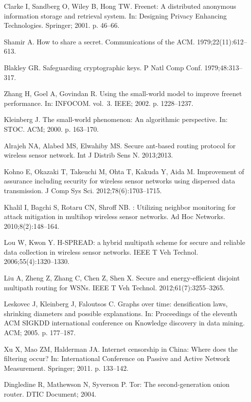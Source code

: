 \documentclass[10pt,letterpaper]{article}
\begin{document}
\begin{thebibliography}{10}
Clarke I, Sandberg O, Wiley B, Hong TW.
\newblock Freenet: {A} distributed anonymous information storage and retrieval
  system.
\newblock In: Designing {Privacy} {Enhancing} {Technologies}. Springer; 2001.
  p. 46--66.

Shamir A.
\newblock How to share a secret.
\newblock Communications of the ACM. 1979;22(11):612--613.

Blakley GR.
\newblock Safeguarding cryptographic keys.
\newblock P Natl Comp Conf. 1979;48:313--317.

Zhang H, Goel A, Govindan R.
\newblock Using the small-world model to improve freenet performance.
\newblock In: {INFOCOM}. vol.~3. IEEE; 2002. p. 1228--1237.

Kleinberg J.
\newblock The small-world phenomenon: {An} algorithmic perspective.
\newblock In: {STOC}. ACM; 2000. p. 163--170.

Alrajeh NA, Alabed MS, Elwahiby MS.
\newblock Secure ant-based routing protocol for wireless sensor network.
\newblock Int J Distrib Sens N. 2013;2013.

Kohno E, Okazaki T, Takeuchi M, Ohta T, Kakuda Y, Aida M.
\newblock Improvement of assurance including security for wireless sensor
  networks using dispersed data transmission.
\newblock J Comp Sys Sci. 2012;78(6):1703--1715.

Khalil I, Bagchi S, Rotaru CN, Shroff NB.
: {Utilizing} neighbor monitoring for attack mitigation in
  multihop wireless sensor networks.
\newblock Ad Hoc Networks. 2010;8(2):148--164.

Lou W, Kwon Y.
\newblock H-{SPREAD}: a hybrid multipath scheme for secure and reliable data
  collection in wireless sensor networks.
\newblock IEEE T Veh Technol. 2006;55(4):1320--1330.

Liu A, Zheng Z, Zhang C, Chen Z, Shen X.
\newblock Secure and energy-efficient disjoint multipath routing for {WSNs}.
\newblock IEEE T Veh Technol. 2012;61(7):3255--3265.

Leskovec J, Kleinberg J, Faloutsos C.
\newblock Graphs over time: densification laws, shrinking diameters and
  possible explanations.
\newblock In: Proceedings of the eleventh {ACM} {SIGKDD} international
  conference on {Knowledge} discovery in data mining. ACM; 2005. p. 177--187.

Xu X, Mao ZM, Halderman JA.
\newblock Internet censorship in {China}: {Where} does the filtering occur?
\newblock In: International {Conference} on {Passive} and {Active} {Network}
  {Measurement}. Springer; 2011. p. 133--142.

Dingledine R, Mathewson N, Syverson P.
\newblock Tor: {The} second-generation onion router.
\newblock DTIC Document; 2004.

\end{thebibliography}
\end{document}
